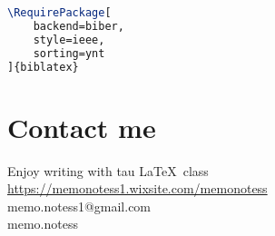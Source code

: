 \documentclass[9pt,a4paper,twoside]{tau}
\begin{document}
\begin{lstlisting}[language=TeX, caption=References style.]
\RequirePackage[
    backend=biber,
    style=ieee,
    sorting=ynt
]{biblatex}


\end{lstlisting}

\section{Contact me}

    Enjoy writing with tau \LaTeX\ class\hspace{5pt}\faChessKnight \\ 

    \noindent\faWix\hspace{5pt}\href{https://memonotess1.wixsite.com/memonotess}{https://memonotess1.wixsite.com/memonotess} \\
    \faEnvelope[regular]\hspace{5pt}memo.notess1@gmail.com \\
    \faInstagram\hspace{5pt}memo.notess
    

\printbibliography

\end{document}
